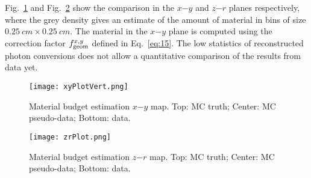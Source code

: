 Fig.~\ref{xyPlot} and Fig.~\ref{zrPlot} show the comparison in the $x$$-$$y$ and $z$$-$$r$ planes respectively, where the grey density 
gives an estimate of the amount of material in bins of size $0.25~cm\times0.25~cm$. 
The material in the $x$$-$$y$ plane is computed using the correction factor $f^{x, y}_{\rm geom}$ defined in Eq.~\ref{eq:15}.
The low statistics of reconstructed photon conversions does not allow a quantitative comparison of the results from data yet.

\begin{figure}[!hbtp]
\centering
\texttt{[image: xyPlotVert.png]}
\caption{Material budget estimation $x$$-$$y$ map. Top: MC truth; Center: MC pseudo-data; Bottom: data.}
\label{xyPlot}
\end{figure}

\begin{figure}[!hbtp]
\centering
\texttt{[image: zrPlot.png]}
\caption{Material budget estimation $z$$-$$r$ map. Top: MC truth; Center: MC pseudo-data; Bottom: data.}
\label{zrPlot}
\end{figure}
